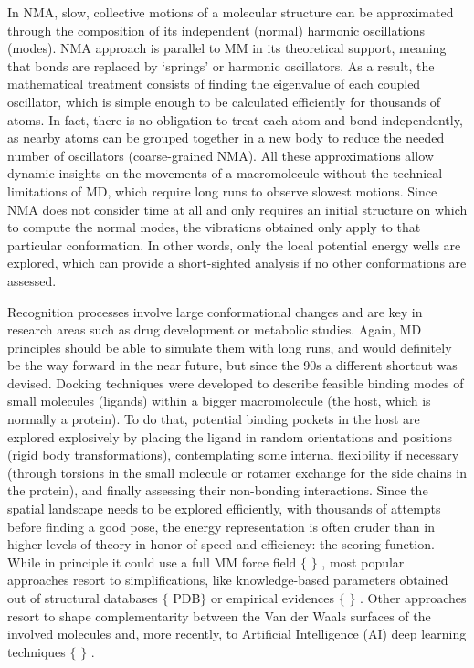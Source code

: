 In NMA, slow, collective motions of a molecular structure can be approximated through the composition of its independent (normal) harmonic oscillations (modes). NMA approach is parallel to MM in its theoretical support, meaning that bonds are replaced by ‘springs’ or harmonic oscillators. As a result, the mathematical treatment consists of finding the eigenvalue of each coupled oscillator, which is simple enough to be calculated efficiently for thousands of atoms. In fact, there is no obligation to treat each atom and bond independently, as nearby atoms can be grouped together in a new body to reduce the needed number of oscillators (coarse-grained NMA). All these approximations allow dynamic insights on the movements of a macromolecule without the technical limitations of MD, which require long runs to observe slowest motions. Since NMA does not consider time at all and only requires an initial structure on which to compute the normal modes, the vibrations obtained only apply to that particular conformation. In other words, only the local potential energy wells are explored, which can provide a short-sighted analysis if no other conformations are assessed.

Recognition processes involve large conformational changes and are key in research areas such as drug development or metabolic studies. Again, MD principles should be able to simulate them with long runs, and would definitely be the way forward in the near future,\cite{devivo2017} but since the 90s a different shortcut was devised. Docking techniques were developed to describe feasible binding modes of small molecules (ligands) within a bigger macromolecule (the host, which is normally a protein). To do that, potential binding pockets in the host are explored explosively by placing the ligand in random orientations and positions (rigid body transformations), contemplating some internal flexibility if necessary (through torsions in the small molecule or rotamer exchange for the side chains in the protein), and finally assessing their non-bonding interactions. Since the spatial landscape needs to be explored efficiently, with thousands of attempts before finding a good pose, the energy representation is often cruder than in higher levels of theory in honor of speed and efficiency: the scoring function. While in principle it could use a full MM force field $ \{ $ $ \} $ , most popular approaches resort to simplifications, like knowledge-based parameters obtained out of structural databases $ \{ $ PDB$ \} $  or empirical evidences $ \{ $ $ \} $ . Other approaches resort to shape complementarity between the Van der Waals surfaces of the involved molecules and, more recently, to Artificial Intelligence (AI) deep learning techniques $ \{ $ $ \} $ .

